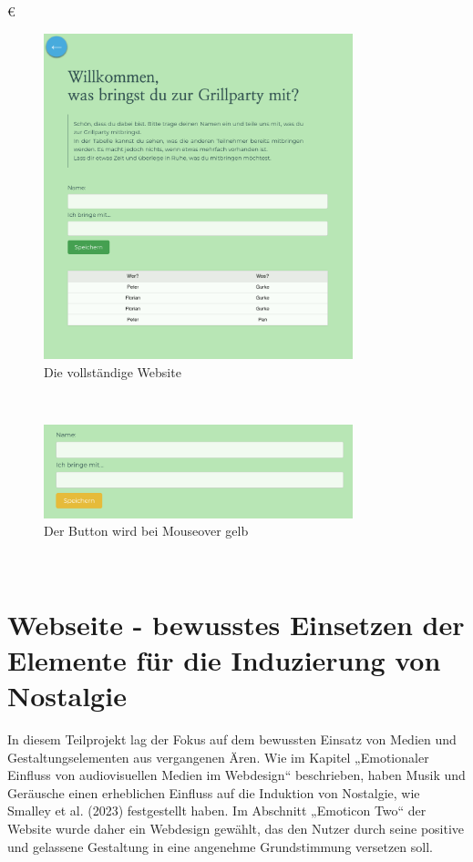 €\documentclass[./dokumentation.tex]{subfiles}
\begin{document}
\begin{figure}[H]
    \centering
    \includegraphics[width=0.8\textwidth]{bilder/website-gelassen.png}
    \caption{Die vollständige Website}
    \label{fig21:website-gelassen}
    \end{figure}\\

\begin{figure}[H]
        \centering
        \includegraphics[width=0.8\textwidth]{bilder/website-gelassen-hover.png}
        \caption{Der Button wird bei Mouseover gelb}
        \label{fig22:website-gelassen-hover}
\end{figure}\\
    

\pagebreak
\section{Webseite - bewusstes Einsetzen der Elemente für die Induzierung von Nostalgie}
In diesem Teilprojekt lag der Fokus auf dem bewussten Einsatz von Medien und Gestaltungselementen aus vergangenen Ären. Wie im Kapitel „Emotionaler Einfluss von audiovisuellen Medien im Webdesign“ beschrieben, haben Musik und Geräusche einen erheblichen Einfluss auf die Induktion von Nostalgie, wie Smalley et al. (2023) festgestellt haben. Im Abschnitt „Emoticon Two“ der Website wurde daher ein Webdesign gewählt, das den Nutzer durch seine positive und gelassene Gestaltung in eine angenehme Grundstimmung versetzen soll. \\
\end{document}
